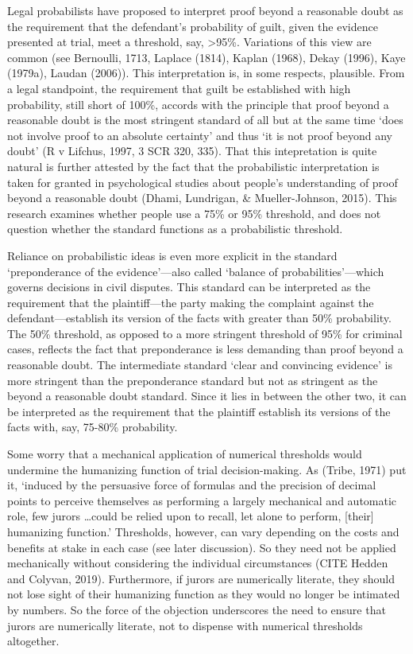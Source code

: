 \documentclass[10pt,dvipsnames]{scrartcl}
\begin{document}
Legal probabilists have proposed to interpret proof beyond a reasonable
doubt as the requirement that the defendant's probability of guilt,
given the evidence presented at trial, meet a threshold, say,
\textgreater{}95\%. Variations of this view are common (see Bernoulli,
1713, Laplace (1814), Kaplan (1968), Dekay (1996), Kaye (1979a), Laudan
(2006)). This interpretation is, in some respects, plausible. From a
legal standpoint, the requirement that guilt be established with high
probability, still short of 100\%, accords with the principle that proof
beyond a reasonable doubt is the most stringent standard of all but at
the same time `does not involve proof to an absolute certainty' and thus
`it is not proof beyond any doubt' (R v Lifchus, 1997, 3 SCR 320, 335).
That this intepretation is quite natural is further attested by the fact
that the probabilistic interpretation is taken for granted in
psychological studies about people's understanding of proof beyond a
reasonable doubt (Dhami, Lundrigan, \& Mueller-Johnson, 2015). This
research examines whether people use a 75\% or 95\% threshold, and does
not question whether the standard functions as a probabilistic
threshold.

Reliance on probabilistic ideas is even more explicit in the standard
`preponderance of the evidence'---also called `balance of
probabilities'---which governs decisions in civil disputes. This
standard can be interpreted as the requirement that the plaintiff---the
party making the complaint against the defendant---establish its version
of the facts with greater than 50\% probability. The 50\% threshold, as
opposed to a more stringent threshold of 95\% for criminal cases,
reflects the fact that preponderance is less demanding than proof beyond
a reasonable doubt. The intermediate standard `clear and convincing
evidence' is more stringent than the preponderance standard but not as
stringent as the beyond a reasonable doubt standard. Since it lies in
between the other two, it can be interpreted as the requirement that the
plaintiff establish its versions of the facts with, say, 75-80\%
probability.

Some worry that a mechanical application of numerical thresholds would
undermine the humanizing function of trial decision-making. As (Tribe,
1971) put it, `induced by the persuasive force of formulas and the
precision of decimal points to perceive themselves as performing a
largely mechanical and automatic role, few jurors \dots could be relied
upon to recall, let alone to perform, {[}their{]} humanizing function.'
Thresholds, however, can vary depending on the costs and benefits at
stake in each case (see later discussion). So they need not be applied
mechanically without considering the individual circumstances (CITE
Hedden and Colyvan, 2019). Furthermore, if jurors are numerically
literate, they should not lose sight of their humanizing function as
they would no longer be intimated by numbers. So the force of the
objection underscores the need to ensure that jurors are numerically
literate, not to dispense with numerical thresholds altogether.
\end{document}
